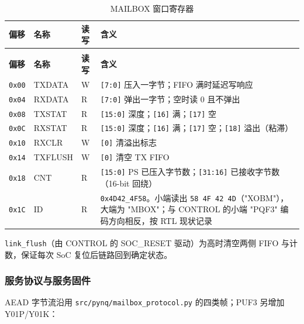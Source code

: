 {\small
\setlength{\tabcolsep}{4pt}
\renewcommand{\thetable}{2-12}
\begin{longtable}{@{}>{\raggedright\arraybackslash}p{}>{\raggedright\arraybackslash}p{}>{\raggedright\arraybackslash}p{}>{\raggedright\arraybackslash}p{}@{}}
\caption{MAILBOX 窗口寄存器}\label{tab:2-12}\\
\toprule
\textbf{偏移} & \textbf{名称} & \textbf{读写} & \textbf{含义} \\
\midrule
\endfirsthead
\multicolumn{4}{@{}l}{\footnotesize 续表 2-12}\\
\toprule
\textbf{偏移} & \textbf{名称} & \textbf{读写} & \textbf{含义} \\
\midrule
\endhead
\texttt{0x00} & TXDATA & W & \texttt{[7:0]} 压入一字节；FIFO 满时延迟写响应 \\
\texttt{0x04} & RXDATA & R & \texttt{[7:0]} 弹出一字节；空时读 0 且不弹出 \\
\texttt{0x08} & TXSTAT & R & \texttt{[15:0]} 深度；\texttt{[16]} 满；\texttt{[17]} 空 \\
\texttt{0x0C} & RXSTAT & R & \texttt{[15:0]} 深度；\texttt{[16]} 满；\texttt{[17]} 空；\texttt{[18]} 溢出（粘滞） \\
\texttt{0x10} & RXCLR & W & \texttt{[0]} 清溢出标志 \\
\texttt{0x14} & TXFLUSH & W & \texttt{[0]} 清空 TX FIFO \\
\texttt{0x18} & CNT & R & \texttt{[15:0]} PS 已压入字节数；\texttt{[31:16]} 已接收字节数（16-bit 回绕） \\
\texttt{0x1C} & ID & R & \texttt{0x4D42\_4F58}。小端读出 \texttt{58 4F 42 4D}（"XOBM"），大端为 "MBOX"；与 CONTROL 的小端 "PQF3" 编码方向相反，按 RTL 现状记录 \\
\bottomrule
\end{longtable}
}

\texttt{link\_\allowbreak{}flush}（由 CONTROL 的 SOC\_RESET 驱动）为高时清空两侧 FIFO 与计数，保证每次 SoC 复位后链路回到确定状态。

\Needspace{85pt}

\subsubsection{服务协议与服务固件}

AEAD 字节流沿用 \texttt{src/pynq/mailbox\_protocol.py} 的四类帧；PUF3 另增加 Y01P/Y01K：

